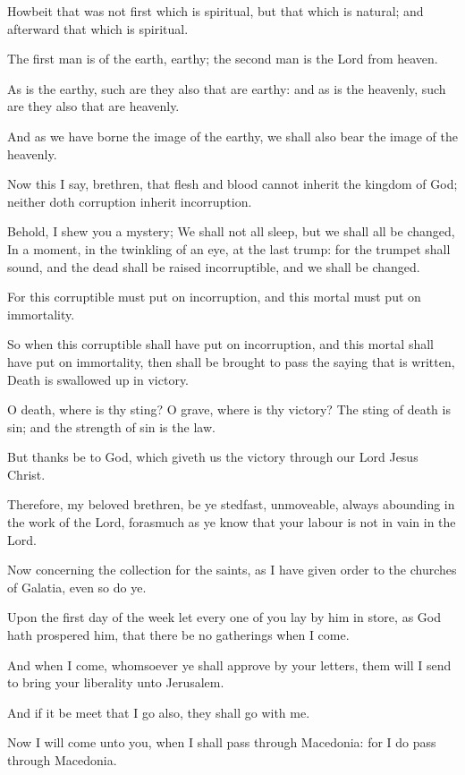 \Verse Howbeit that was not first which is spiritual, but that which is natural; and afterward that which is spiritual.

\Verse The first man is of the earth, earthy; the second man is the Lord from heaven.

\Verse As is the earthy, such are they also that are earthy: and as is the heavenly, such are they also that are heavenly.

\Verse And as we have borne the image of the earthy, we shall also bear the image of the heavenly.

\Verse Now this I say, brethren, that flesh and blood cannot inherit the kingdom of God; neither doth corruption inherit incorruption.

\Verse Behold, I shew you a mystery; We shall not all sleep, but we shall all be changed, \Verse In a moment, in the twinkling of an eye, at the last trump: for the trumpet shall sound, and the dead shall be raised incorruptible, and we shall be changed.

\Verse For this corruptible must put on incorruption, and this mortal must put on immortality.

\Verse So when this corruptible shall have put on incorruption, and this mortal shall have put on immortality, then shall be brought to pass the saying that is written, Death is swallowed up in victory.

\Verse O death, where is thy sting? O grave, where is thy victory?  \Verse The sting of death is sin; and the strength of sin is the law.

\Verse But thanks be to God, which giveth us the victory through our Lord Jesus Christ.

\Verse Therefore, my beloved brethren, be ye stedfast, unmoveable, always abounding in the work of the Lord, forasmuch as ye know that your labour is not in vain in the Lord.


\Chapter
\Verse Now concerning the collection for the saints, as I have given order to the churches of Galatia, even so do ye.

\Verse Upon the first day of the week let every one of you lay by him in store, as God hath prospered him, that there be no gatherings when I come.

\Verse And when I come, whomsoever ye shall approve by your letters, them will I send to bring your liberality unto Jerusalem.

\Verse And if it be meet that I go also, they shall go with me.

\Verse Now I will come unto you, when I shall pass through Macedonia: for I do pass through Macedonia.

